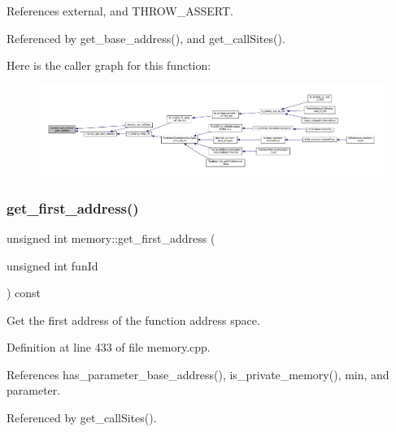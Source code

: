 References external, and T\+H\+R\+O\+W\+\_\+\+A\+S\+S\+E\+RT.



Referenced by get\+\_\+base\+\_\+address(), and get\+\_\+call\+Sites().

Here is the caller graph for this function\+:
\nopagebreak
\begin{figure}[H]
\begin{center}
\leavevmode
\includegraphics[width=350pt]{d8/d99/classmemory_a32fccfbb1ec87572fffb59d3a8a93548_icgraph}
\end{center}
\end{figure}
\mbox{\label{classmemory_a8288dc9efc8050b3d34cb06b74a1d3db}} 
\subsubsection{\texorpdfstring{get\+\_\+first\+\_\+address()}{get\_first\_address()}}
{\footnotesize\ttfamily unsigned int memory\+::get\+\_\+first\+\_\+address (\begin{DoxyParamCaption}\item[{unsigned int}]{fun\+Id }\end{DoxyParamCaption}) const}



Get the first address of the function address space. 



Definition at line 433 of file memory.\+cpp.



References has\+\_\+parameter\+\_\+base\+\_\+address(), is\+\_\+private\+\_\+memory(), min, and parameter.



Referenced by get\+\_\+call\+Sites().

